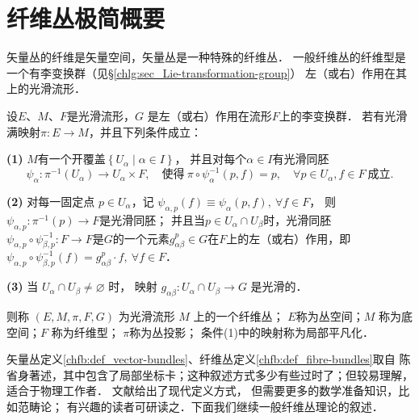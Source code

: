 
\section{纤维丛极简概要}\label{chfb:sec_fb}
矢量丛的纤维是矢量空间，矢量丛是一种特殊的纤维丛．
一般纤维丛的纤维型是一个有李变换群（见\S\ref{chlg:sec_Lie-transformation-group}）
左（或右）作用在其上的光滑流形．

\begin{definition}\label{chfb:def_fibre-bundles}
    设$E$、$ M$、$ F$是光滑流形，$G$ 是左（或右）作用在流形$F$上的李变换群．
    若有光滑满映射$\pi: E \rightarrow M$，并且下列条件成立：
    
    {\bfseries (1)} $M$有一个开覆盖$\left\{U_\alpha \mid \alpha \in I\right\}$，
    并且对每个$\alpha \in I$有光滑同胚
    \begin{equation*}
        \psi_\alpha: \pi^{-1}(U_\alpha) \to U_\alpha \times F,
        \quad \text{使得}\ 
        \pi \circ \psi_\alpha^{-1}(p, f)=p, \quad \forall p \in U_\alpha, f \in F 
        \ \text{成立}.
    \end{equation*}
    
    {\bfseries (2)} 对每一固定点 $p \in U_\alpha$，记
    $\psi_{\alpha, p}(f)\equiv \psi_\alpha(p, f), \ \forall f \in F$，
    则 $\psi_{\alpha, p}: \pi^{-1}(p)\to F$是光滑同胚；
    并且当$p \in U_\alpha \cap U_\beta$时，光滑同胚$\psi_{\alpha, p}\circ \psi_{\beta, p}^{-1}:
    F \rightarrow F$是$G$的一个元素$g_{\alpha \beta}^p\in G$在$F$上的左（或右）作用，即
    $\psi_{\alpha, p} \circ \psi_{\beta, p}^{-1}(f)=g^p_{\alpha \beta} \cdot f, 
    \ \forall f \in F$．
    
    
    {\bfseries (3)} 当 $U_\alpha \cap U_\beta \neq \varnothing$ 时，
    映射 $g_{\alpha \beta}: U_\alpha \cap U_\beta \rightarrow G$ 是光滑的．
    
    则称 $(E, M, \pi, F, G)$ 为光滑流形 $M$ 上的一个{\heiti 纤维丛}；
    $E$称为{\heiti 丛空间}；$M$ 称为{\heiti 底空间}；$F$ 称为{\heiti 纤维型}；
    $\pi$称为{\heiti 丛投影}；
    条件(1)中的映射称为{\heiti 局部平凡化}．
\end{definition}

矢量丛定义\ref{chfb:def_vector-bundles}、纤维丛定义\ref{chfb:def_fibre-bundles}取自
陈省身著述，其中包含了局部坐标卡；这种叙述方式多少有些过时了；但较易理解，适合于物理工作者．
文献\parencite{Husemoller-1994}给出了现代定义方式，%
但需要更多的数学准备知识，比如范畴论；
有兴趣的读者可研读之．下面我们继续一般纤维丛理论的叙述．

